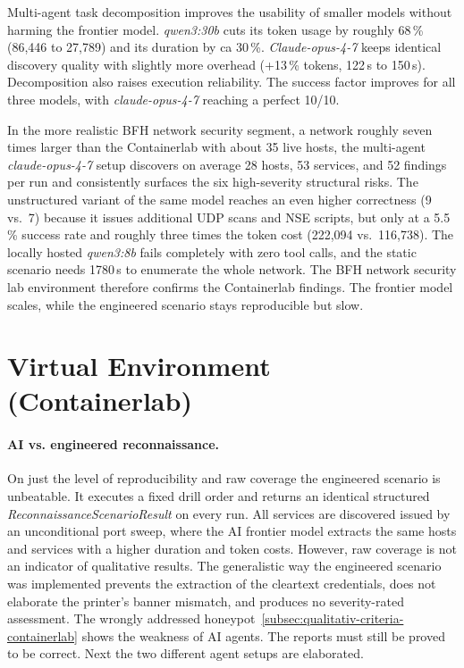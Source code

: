 Multi-agent task decomposition improves the usability of smaller models without harming the frontier model.
\textit{qwen3:30b} cuts its token usage by roughly 68\,\% (86,446 to 27,789) and its
duration by ca 30\,\%.
\textit{Claude-opus-4-7} keeps identical discovery quality with slightly more overhead (+13\,\% tokens, 122\,s to 150\,s).
Decomposition also raises execution reliability.
The success factor improves for all three models, with \textit{claude-opus-4-7} reaching a perfect 10/10.

In the more realistic BFH network security segment, a network roughly seven times larger than
the \gls{Containerlab} with about 35 live hosts, the multi-agent \textit{claude-opus-4-7} setup discovers on average 28 hosts, 53 services, and
52 findings per run and consistently surfaces the six high-severity structural risks.
The unstructured variant of the same model reaches an even higher correctness (9 vs.\ 7) because it
issues additional \gls{UDP} scans and \gls{NSE} scripts, but only at a 5.5\,\% success rate
and roughly three times the token cost (222,094 vs.\ 116,738).
The locally hosted \textit{qwen3:8b} fails completely with zero tool calls, and the static scenario
needs 1780\,s to enumerate the whole network.
The BFH network security lab environment therefore confirms the \gls{Containerlab} findings.
The frontier model scales, while the engineered scenario stays reproducible but slow.

\section{Virtual Environment (Containerlab)}\label{sec:discussion-containerlab}

\paragraph{AI vs. engineered reconnaissance.}

On just the level of reproducibility and raw coverage the engineered scenario is unbeatable.
It executes a fixed drill order and returns an identical structured \textit{ReconnaissanceScenarioResult}
on every run.
All services are discovered issued by an unconditional port sweep, where the \gls{AI} frontier model extracts the same
hosts and services with a higher duration and token costs.
However, raw coverage is not an indicator of qualitative results.
The generalistic way the engineered scenario was implemented prevents the extraction of the cleartext credentials,
does not elaborate the printer's banner mismatch, and produces no severity-rated assessment.
The wrongly addressed honeypot~\ref{subsec:qualitativ-criteria-containerlab} shows the weakness of \gls{AI} agents.
The reports must still be proved to be correct.
Next the two different agent setups are elaborated.

